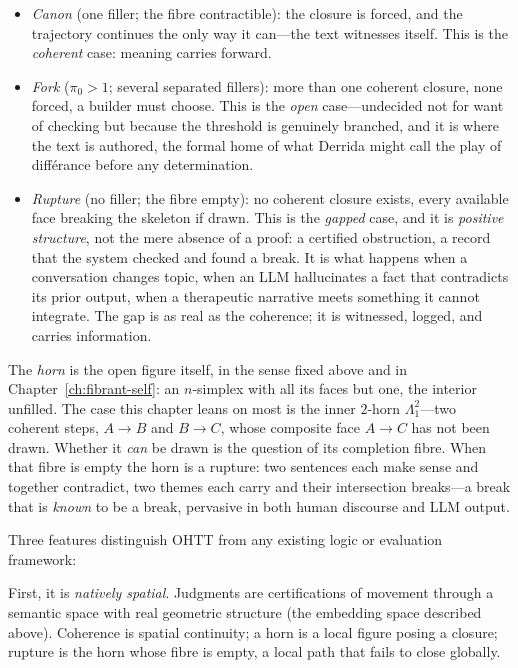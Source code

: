 \begin{itemize}
\item \textit{Canon} (one filler; the fibre contractible): the closure is forced, and the trajectory continues the only way it can---the text witnesses itself.  This is the \textit{coherent} case: meaning carries forward.
\item \textit{Fork} ($\pi_0 > 1$; several separated fillers): more than one coherent closure, none forced, a builder must choose.  This is the \textit{open} case---undecided not for want of checking but because the threshold is genuinely branched, and it is where the text is authored, the formal home of what Derrida might call the play of diff\'erance before any determination.
\item \textit{Rupture} (no filler; the fibre empty): no coherent closure exists, every available face breaking the skeleton if drawn.  This is the \textit{gapped} case, and it is \textit{positive structure}, not the mere absence of a proof: a certified obstruction, a record that the system checked and found a break.  It is what happens when a conversation changes topic, when an LLM hallucinates a fact that contradicts its prior output, when a therapeutic narrative meets something it cannot integrate.  The gap is as real as the coherence; it is witnessed, logged, and carries information.
\end{itemize}

The \textit{horn} is the open figure itself, in the sense fixed above and in Chapter~\ref{ch:fibrant-self}: an $n$-simplex with all its faces but one, the interior unfilled.  The case this chapter leans on most is the inner $2$-horn $\Lambda^2_1$---two coherent steps, $A \to B$ and $B \to C$, whose composite face $A \to C$ has not been drawn.  Whether it \textit{can} be drawn is the question of its completion fibre.  When that fibre is empty the horn is a rupture: two sentences each make sense and together contradict, two themes each carry and their intersection breaks---a break that is \textit{known} to be a break, pervasive in both human discourse and LLM output.

Three features distinguish OHTT from any existing logic or evaluation framework:

First, it is \textit{natively spatial}.  Judgments are certifications of movement through a semantic space with real geometric structure (the embedding space described above).  Coherence is spatial continuity; a horn is a local figure posing a closure; rupture is the horn whose fibre is empty, a local path that fails to close globally.

